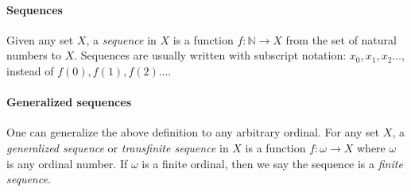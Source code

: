 \documentclass{article}
\begin{document}
\paragraph{Sequences}

Given any set $X$, a \emph{sequence} in $X$ is a function $f\colon \mathbb{N} \to X$ from the set of natural numbers to $X$. Sequences are usually written with subscript notation: $x_0, x_1, x_2 \dots$, instead of $f(0), f(1), f(2) \dots $.

\paragraph{Generalized sequences}

One can generalize the above definition to any arbitrary ordinal. For any set $X$, a \emph{generalized sequence} or \emph{transfinite sequence} in $X$ is a function $f\colon \omega \to X$ where $\omega$ is any ordinal number. If $\omega$ is a finite ordinal, then we say the sequence is a \emph{finite sequence}.
\end{document}
